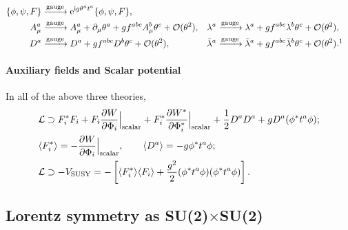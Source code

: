 \documentclass[CheatSheet]{subfiles}
\begin{document}
\begin{align*}
   \{\phi,\psi,F\}&\xrightarrow{\text{gauge}} \ee^{\ii g \theta^at^a}\{\phi,\psi,F\},\\
   A_\mu^a&\xrightarrow{\text{gauge}} A^a_\mu+\partial_\mu \theta^a
   + g f^{abc}A_\mu^b\theta^c  + \Order(\theta^2),
 &\lambda^a&\xrightarrow{\text{gauge}}\lambda^a+gf^{abc}\lambda^b\theta^c+\Order(\theta^2),
 \\
 D^a&\xrightarrow{\text{gauge}} D^a+gf^{abc}D^b\theta^c+\Order(\theta^2),
& \blambda^a&\xrightarrow{\text{gauge}}\blambda^a+gf^{abc}\blambda^b\theta^c + \Order(\theta^2).
\footnotemark
\end{align*}

\paragraph{Auxiliary fields and Scalar potential}
In all of the above three theories,
\begin{align}
& \mathcal L\supset
F^*_i F_i
+ F_i\frac{\partial W}{\partial \Phi_i}\Big|_{\mathrm{scalar}}
+ F_i^*\frac{\partial W^*}{\partial \Phi_i^*}\Big|_{\mathrm{scalar}}
+\frac12 D^aD^a + g D^a(\phi^*t^a\phi);
\\&
 \langle F^*_i\rangle = -\frac{\partial W}{\partial \Phi_i}\Big|_{\mathrm{scalar}},\qquad
 \langle D^a\rangle = -g\phi^*t^a\phi;
\\&
 \mathcal L\supset -V_{\mathrm{SUSY}} = -
\left[\langle F^*_i\rangle\langle F_i\rangle+\frac{g^2}2 (\phi^*t^a\phi)(\phi^*t^a\phi)\right].
\end{align}



\clearpage
\detailstyle

\subsection{Lorentz symmetry as SU(2)$\times$SU(2)}
\end{document}
